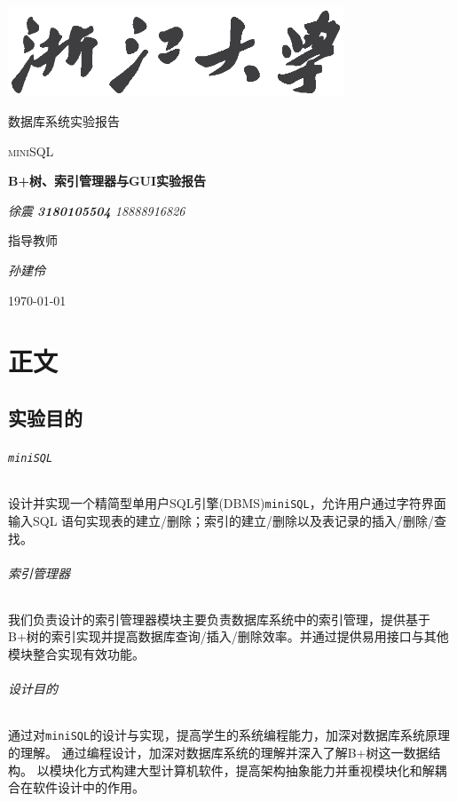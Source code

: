 \documentclass[UTF8]{ctexrep} %
\begin{document}
\begin{titlepage}
	\centering
	\includegraphics[width=0.75\textwidth]{figure/浙江大学.eps}\par\vspace{1cm}
	{\textsc{\LARGE 数据库系统实验报告}\par}
	\vspace{1.5cm}
	{\huge\textsc{miniSQL}\par}
	{\huge\textbf{B+树、索引管理器与GUI实验报告}\par}
	\vspace{2cm}
	{\Large\itshape 徐震 \textbf{3180105504} 18888916826\par}
	\vfill
	指导教师\par
	\textit{孙建伶}

	\vfill

	{\large \today\par}
\end{titlepage}

\newpage
\tableofcontents
\newpage
\part{正文}
\chapter{实验目的}
\paragraph{\texttt{miniSQL}}
设计并实现一个精简型单用户SQL引擎(DBMS)\texttt{miniSQL}，允许用户通过字符界面输入SQL 语句实现表的建立/删除；索引的建立/删除以及表记录的插入/删除/查找。
\paragraph{索引管理器}
我们负责设计的索引管理器模块主要负责数据库系统中的索引管理，提供基于B+树的索引实现并提高数据库查询/插入/删除效率。并通过提供易用接口与其他模块整合实现有效功能。
\paragraph{设计目的}
通过对\texttt{miniSQL}的设计与实现，提高学生的系统编程能力，加深对数据库系统原理的理解。
通过编程设计，加深对数据库系统的理解并深入了解B+树这一数据结构。
以模块化方式构建大型计算机软件，提高架构抽象能力并重视模块化和解耦合在软件设计中的作用。
\end{document}
